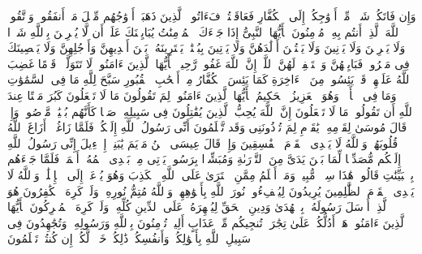 \stopbuffer%
\startbuffer[\q:60:11]
وَإِن فَاتَكُمۡ شَیۡءࣱ مِّنۡ أَزۡوَٰجِكُمۡ إِلَى ٱلۡكُفَّارِ فَعَاقَبۡتُمۡ فَءَاتُوا۟ ٱلَّذِینَ ذَهَبَتۡ أَزۡوَٰجُهُم مِّثۡلَ مَاۤ أَنفَقُوا۟ۚ وَٱتَّقُوا۟ ٱللَّهَ ٱلَّذِیۤ أَنتُم بِهِۦ مُؤۡمِنُونَ%
\stopbuffer%
\startbuffer[\q:60:12]
یَٰۤأَیُّهَا ٱلنَّبِیُّ إِذَا جَاۤءَكَ ٱلۡمُؤۡمِنَٰتُ یُبَایِعۡنَكَ عَلَىٰۤ أَن لَّا یُشۡرِكۡنَ بِٱللَّهِ شَیۡءࣰا وَلَا یَسۡرِقۡنَ وَلَا یَزۡنِینَ وَلَا یَقۡتُلۡنَ أَوۡلَٰدَهُنَّ وَلَا یَأۡتِینَ بِبُهۡتَٰنࣲ یَفۡتَرِینَهُۥ بَیۡنَ أَیۡدِیهِنَّ وَأَرۡجُلِهِنَّ وَلَا یَعۡصِینَكَ فِی مَعۡرُوفࣲ فَبَایِعۡهُنَّ وَٱسۡتَغۡفِرۡ لَهُنَّ ٱللَّهَۚ إِنَّ ٱللَّهَ غَفُورࣱ رَّحِیمࣱ%
\stopbuffer%
\startbuffer[\q:60:13]
یَٰۤأَیُّهَا ٱلَّذِینَ ءَامَنُوا۟ لَا تَتَوَلَّوۡا۟ قَوۡمًا غَضِبَ ٱللَّهُ عَلَیۡهِمۡ قَدۡ یَئِسُوا۟ مِنَ ٱلۡءَاخِرَةِ كَمَا یَئِسَ ٱلۡكُفَّارُ مِنۡ أَصۡحَٰبِ ٱلۡقُبُورِ%
\stopbuffer%
\startbuffer[\q:61:1]
سَبَّحَ لِلَّهِ مَا فِی ٱلسَّمَٰوَٰتِ وَمَا فِی ٱلۡأَرۡضِۖ وَهُوَ ٱلۡعَزِیزُ ٱلۡحَكِیمُ%
\stopbuffer%
\startbuffer[\q:61:2]
یَٰۤأَیُّهَا ٱلَّذِینَ ءَامَنُوا۟ لِمَ تَقُولُونَ مَا لَا تَفۡعَلُونَ%
\stopbuffer%
\startbuffer[\q:61:3]
كَبُرَ مَقۡتًا عِندَ ٱللَّهِ أَن تَقُولُوا۟ مَا لَا تَفۡعَلُونَ%
\stopbuffer%
\startbuffer[\q:61:4]
إِنَّ ٱللَّهَ یُحِبُّ ٱلَّذِینَ یُقَٰتِلُونَ فِی سَبِیلِهِۦ صَفࣰّا كَأَنَّهُم بُنۡیَٰنࣱ مَّرۡصُوصࣱ%
\stopbuffer%
\startbuffer[\q:61:5]
وَإِذۡ قَالَ مُوسَىٰ لِقَوۡمِهِۦ یَٰقَوۡمِ لِمَ تُؤۡذُونَنِی وَقَد تَّعۡلَمُونَ أَنِّی رَسُولُ ٱللَّهِ إِلَیۡكُمۡۖ فَلَمَّا زَاغُوۤا۟ أَزَاغَ ٱللَّهُ قُلُوبَهُمۡۚ وَٱللَّهُ لَا یَهۡدِی ٱلۡقَوۡمَ ٱلۡفَٰسِقِینَ%
\stopbuffer%
\startbuffer[\q:61:6]
وَإِذۡ قَالَ عِیسَى ٱبۡنُ مَرۡیَمَ یَٰبَنِیۤ إِسۡرَٰۤءِیلَ إِنِّی رَسُولُ ٱللَّهِ إِلَیۡكُم مُّصَدِّقࣰا لِّمَا بَیۡنَ یَدَیَّ مِنَ ٱلتَّوۡرَىٰةِ وَمُبَشِّرَۢا بِرَسُولࣲ یَأۡتِی مِنۢ بَعۡدِی ٱسۡمُهُۥۤ أَحۡمَدُۖ فَلَمَّا جَاۤءَهُم بِٱلۡبَیِّنَٰتِ قَالُوا۟ هَٰذَا سِحۡرࣱ مُّبِینࣱ%
\stopbuffer%
\startbuffer[\q:61:7]
وَمَنۡ أَظۡلَمُ مِمَّنِ ٱفۡتَرَىٰ عَلَى ٱللَّهِ ٱلۡكَذِبَ وَهُوَ یُدۡعَىٰۤ إِلَى ٱلۡإِسۡلَٰمِۚ وَٱللَّهُ لَا یَهۡدِی ٱلۡقَوۡمَ ٱلظَّٰلِمِینَ%
\stopbuffer%
\startbuffer[\q:61:8]
یُرِیدُونَ لِیُطۡفِءُوا۟ نُورَ ٱللَّهِ بِأَفۡوَٰهِهِمۡ وَٱللَّهُ مُتِمُّ نُورِهِۦ وَلَوۡ كَرِهَ ٱلۡكَٰفِرُونَ%
\stopbuffer%
\startbuffer[\q:61:9]
هُوَ ٱلَّذِیۤ أَرۡسَلَ رَسُولَهُۥ بِٱلۡهُدَىٰ وَدِینِ ٱلۡحَقِّ لِیُظۡهِرَهُۥ عَلَى ٱلدِّینِ كُلِّهِۦ وَلَوۡ كَرِهَ ٱلۡمُشۡرِكُونَ%
\stopbuffer%
\startbuffer[\q:61:10]
یَٰۤأَیُّهَا ٱلَّذِینَ ءَامَنُوا۟ هَلۡ أَدُلُّكُمۡ عَلَىٰ تِجَٰرَةࣲ تُنجِیكُم مِّنۡ عَذَابٍ أَلِیمࣲ%
\stopbuffer%
\startbuffer[\q:61:11]
تُؤۡمِنُونَ بِٱللَّهِ وَرَسُولِهِۦ وَتُجَٰهِدُونَ فِی سَبِیلِ ٱللَّهِ بِأَمۡوَٰلِكُمۡ وَأَنفُسِكُمۡۚ ذَٰلِكُمۡ خَیۡرࣱ لَّكُمۡ إِن كُنتُمۡ تَعۡلَمُونَ%
